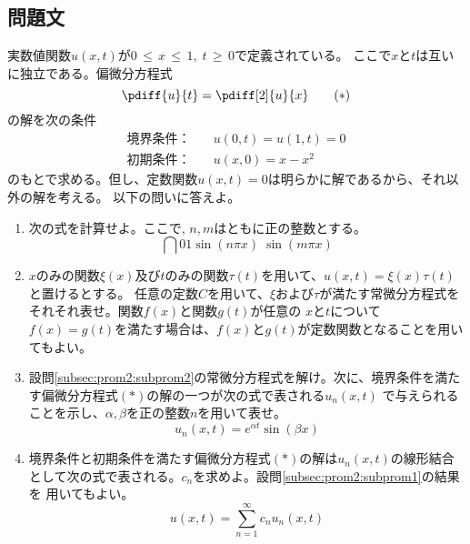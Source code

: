 \subsection{問題文}
実数値関数$u(x, t)$が$0\, \leq \, x\, \leq\, 1, \; t\, \geq \, 0$で定義されている。
ここで$x$と$t$は互いに独立である。偏微分方程式
\begin{equation*}
    \pdiff{u}{t} = \pdiff[2]{u}{x} \qquad (*)
\end{equation*}
の解を次の条件
\begin{align*}
    \mbox{境界条件：} & \quad u(0, t) = u(1, t) = 0\\
    \mbox{初期条件：} & \quad u(x, 0) = x - x^{2}
\end{align*}
のもとで求める。但し、定数関数$u(x, t) = 0$は明らかに解であるから、それ以外の解を考える。
以下の問いに答えよ。
\begin{enumerate}[(1)]
    \item 次の式を計算せよ。ここで, $n, m$はともに正の整数とする。
        \begin{equation*}
            \dint{0}{1}{\sin (n\pi x)\; \sin (m\pi x)}
        \end{equation*}\label{subsec:prom2:subprom1}
    \item $x$のみの関数$\xi (x)$及び$t$のみの関数$\tau (t)$を用いて、$u(x, t) = \xi (x)\tau (t)$と置けるとする。
        任意の定数$C$を用いて、$\xi$および$\tau$が満たす常微分方程式をそれそれ表せ。関数$f(x)$と関数$g(t)$が任意の
        $x$と$t$について$f(x) = g(t)$を満たす場合は、$f(x)$と$g(t)$が定数関数となることを用いてもよい。\label{subsec:prom2:subprom2}
    \item 設問\eqref{subsec:prom2:subprom2}の常微分方程式を解け。次に、境界条件を満たす偏微分方程式$(*)$の解の一つが次の式で表される$u_n(x, t)$
        で与えられることを示し、$\alpha, \beta$を正の整数$n$を用いて表せ。
        \begin{equation*}
            u_n (x, t) = e^{\alpha t}\sin (\beta x)
        \end{equation*}\label{subsec:prom2:subprom3}
    \item 境界条件と初期条件を満たす偏微分方程式$(*)$の解は$u_n (x, t)$の線形結合として次の式で表される。$c_n$を求めよ。設問\eqref{subsec:prom2:subprom1}の結果を
        用いてもよい。
        \begin{equation*}
            u(x, t) = \sum\limits_{n = 1}^{\infty} c_n u_n (x, t)
        \end{equation*}\label{subsec:prom2:subprom4}
\end{enumerate}
\newpage
